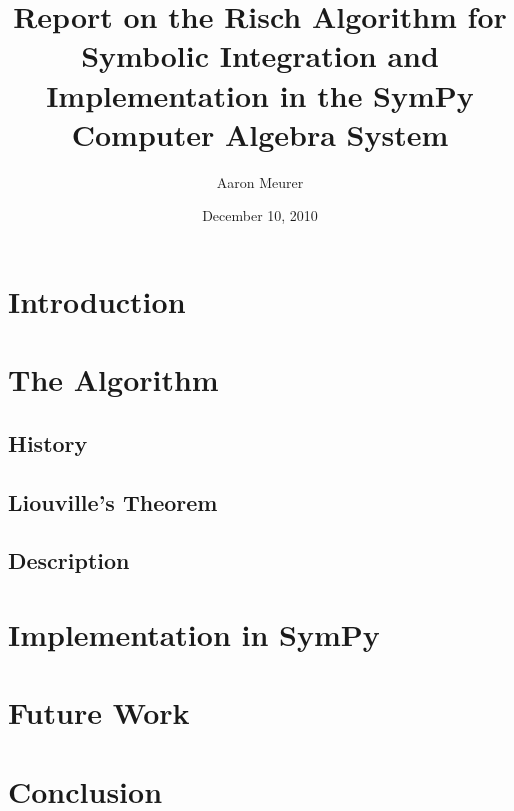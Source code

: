 \documentclass[12pt,titlepage]{article}
\begin{document}

\title{Report on the Risch Algorithm for Symbolic
Integration and Implementation in the SymPy Computer Algebra System}
\author{Aaron Meurer}
\date{December 10, 2010}
\maketitle
%
\begin{abstract}

\end{abstract}

\tableofcontents

\section{Introduction}
\label{introduction}


\section{The Algorithm}
\subsection{History}
\label{history}


\subsection{Liouville's Theorem}
\label{liouville}


\subsection{Description}
\label{description}


\section{Implementation in SymPy}
\label{implementation}


\section{Future Work}
\label{future}


\section{Conclusion}
\label{conclusion}

\end{document}
